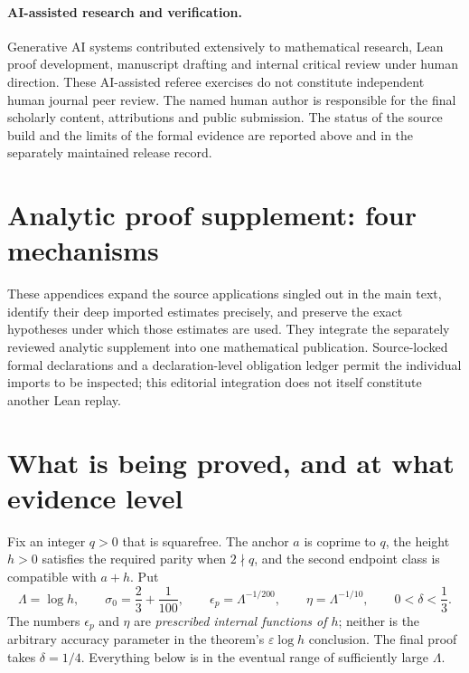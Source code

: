 \documentclass[11pt]{article}
\newcommand{\Lam}{\Lambda}
\newcommand{\epsp}{\epsilon_p}
\theoremstyle{definition}
\theoremstyle{remark}
\newcommand{\1}{\mathbf 1}
\begin{document}
\paragraph{AI-assisted research and verification.}
Generative AI systems contributed extensively to mathematical research,
Lean proof development, manuscript drafting and internal critical review
under human direction. These AI-assisted referee exercises do not constitute
independent human journal peer review. The named human author is responsible
for the final scholarly content, attributions and public submission.
The status of the source build and the limits of the formal evidence are
reported above and in the separately maintained release record.

\medskip
\appendix
{}
{}
\section*{Analytic proof supplement: four mechanisms}
These appendices expand the source applications singled out in the main text,
identify their deep imported estimates precisely, and preserve the exact
hypotheses under which those estimates are used. They integrate the separately
reviewed analytic supplement into one mathematical publication. Source-locked
formal declarations and a declaration-level obligation ledger permit the
individual imports to be inspected; this editorial integration does not itself
constitute another Lean replay.
\section{What is being proved, and at what evidence level}\label{sec:contract}

Fix an integer $q>0$ that is squarefree. The anchor $a$ is coprime
to $q$, the height $h>0$ satisfies the required parity when $2\nmid q$,
and the second endpoint class is compatible with $a+h$. Put
\begin{equation}\label{eq:basic-parameters}
 \Lam=\log h,\qquad \sigma_0=\frac23+\frac1{100},\qquad
 \epsp=\Lam^{-1/200},\qquad \eta=\Lam^{-1/10},\qquad
 0<\delta<\frac13.
\end{equation}
The numbers $\epsp$ and $\eta$ are \emph{prescribed internal functions
of $h$}; neither is the arbitrary accuracy parameter in the theorem's
$\varepsilon\log h$ conclusion. The final proof takes $\delta=1/4$.
Everything below is in the eventual range of sufficiently large $\Lam$.
\end{document}
